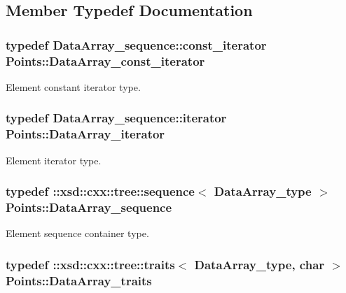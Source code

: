 \subsection{Member Typedef Documentation}
\hypertarget{classPoints_a795a395909c3360569fe0e854ba6059e}{
\subsubsection[{Data\-Array\-\_\-const\-\_\-iterator}]{\setlength{\rightskip}{0pt plus 5cm}typedef Data\-Array\-\_\-sequence\-::const\-\_\-iterator {\bf Points\-::\-Data\-Array\-\_\-const\-\_\-iterator}}}\label{classPoints_a795a395909c3360569fe0e854ba6059e}


Element constant iterator type. 

\hypertarget{classPoints_ac4cd7a177b464c1e08d493600a7e6e16}{
\subsubsection[{Data\-Array\-\_\-iterator}]{\setlength{\rightskip}{0pt plus 5cm}typedef Data\-Array\-\_\-sequence\-::iterator {\bf Points\-::\-Data\-Array\-\_\-iterator}}}\label{classPoints_ac4cd7a177b464c1e08d493600a7e6e16}


Element iterator type. 

\hypertarget{classPoints_ac8b51dcf0e7659ca61ff9b9d24051016}{
\subsubsection[{Data\-Array\-\_\-sequence}]{\setlength{\rightskip}{0pt plus 5cm}typedef \-::xsd\-::cxx\-::tree\-::sequence$<$ {\bf Data\-Array\-\_\-type} $>$ {\bf Points\-::\-Data\-Array\-\_\-sequence}}}\label{classPoints_ac8b51dcf0e7659ca61ff9b9d24051016}


Element sequence container type. 

\hypertarget{classPoints_a815b88c9204c7251f4a08c6769645ef1}{
\subsubsection[{Data\-Array\-\_\-traits}]{\setlength{\rightskip}{0pt plus 5cm}typedef \-::xsd\-::cxx\-::tree\-::traits$<$ {\bf Data\-Array\-\_\-type}, char $>$ {\bf Points\-::\-Data\-Array\-\_\-traits}}}\label{classPoints_a815b88c9204c7251f4a08c6769645ef1}


